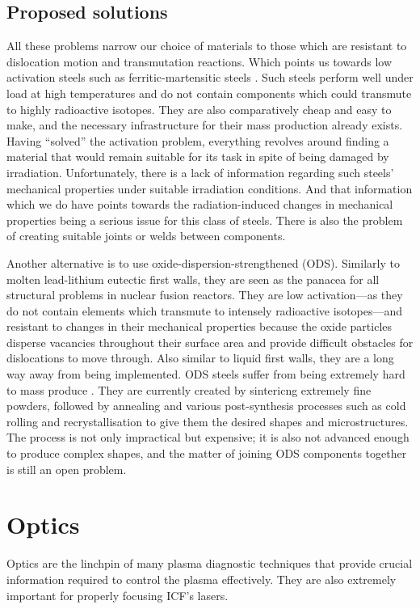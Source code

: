 \documentclass[12pt, a4paper]{article}
\newcommand{\ic}{ICF}
\begin{document}
		\subsection{Proposed solutions}
			All these problems narrow our choice of materials to those which are resistant to dislocation motion and transmutation reactions. Which points us towards low activation steels such as ferritic-martensitic steels \cite{fms1}. Such steels perform well under load at high temperatures and do not contain components which could transmute to highly radioactive isotopes. They are also comparatively cheap and easy to make, and the necessary infrastructure for their mass production already exists. Having ``solved'' the activation problem, everything revolves around finding a material that would remain suitable for its task in spite of being damaged by irradiation. Unfortunately, there is a lack of information regarding such steels' mechanical properties under suitable irradiation conditions. And that information which we do have \cite{fms1, fms2, fms3, fms4} points towards the radiation-induced changes in mechanical properties being a serious issue for this class of steels. There is also the problem of creating suitable joints or welds between components.

			Another alternative is to use oxide-dispersion-strengthened (ODS). Similarly to molten lead-lithium eutectic first walls, they are seen as the panacea for all structural problems in nuclear fusion reactors. They are low activation---as they do not contain elements which transmute to intensely radioactive isotopes---and resistant to changes in their mechanical properties because the oxide particles disperse vacancies throughout their surface area and provide difficult obstacles for dislocations to move through. Also similar to liquid first walls, they are a long way away from being implemented. ODS steels suffer from being extremely hard to mass produce \cite{ods1, ods2, ods3}. They are currently created by sintericng extremely fine powders, followed by annealing and various post-synthesis processes such as cold rolling and recrystallisation to give them the desired shapes and microstructures. The process is not only impractical but expensive; it is also not advanced enough to produce complex shapes, and the matter of joining ODS components together is still an open problem.
	\section{Optics}
		Optics are the linchpin of many plasma diagnostic techniques that provide crucial information required to control the plasma effectively. They are also extremely important for properly focusing \ic's lasers. 
		
\end{document}
